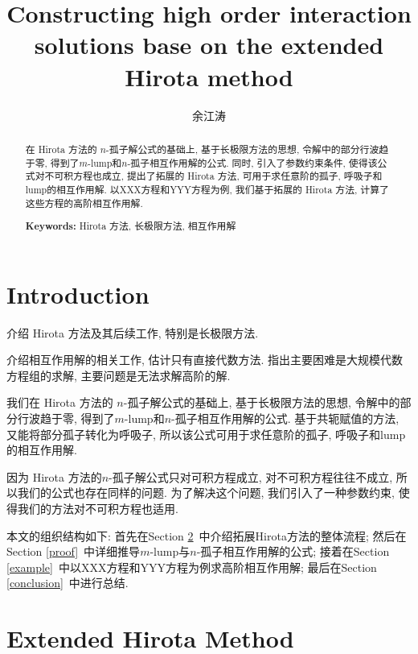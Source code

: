 \documentclass[12pt,a4paper,UTF8]{article}
\newcommand{\refsec}[1]{Section \ref{#1}~}
\begin{document}
\title{Constructing high order interaction solutions base on the extended Hirota method}
\author{余江涛}
\maketitle
\begin{abstract}
在 Hirota 方法的 $n$-孤子解公式的基础上, 基于长极限方法的思想, 令解中的部分行波趋于零, 得到了$m$-lump和$n$-孤子相互作用解的公式. 同时, 引入了参数约束条件, 使得该公式对不可积方程也成立, 提出了拓展的 Hirota 方法, 可用于求任意阶的孤子, 呼吸子和lump的相互作用解. 以XXX方程和YYY方程为例, 我们基于拓展的 Hirota 方法, 计算了这些方程的高阶相互作用解.

\vspace{0.2cm}

{\noindent\bf Keywords:} Hirota 方法, 长极限方法, 相互作用解
\end{abstract}

\section{Introduction}
\begin{compactitem}[\textbullet]
\item 介绍 Hirota 方法及其后续工作, 特别是长极限方法. 
\item 介绍相互作用解的相关工作, 估计只有直接代数方法. 指出主要困难是大规模代数方程组的求解, 主要问题是无法求解高阶的解.
\item 我们在 Hirota 方法的 $n$-孤子解公式的基础上, 基于长极限方法的思想, 令解中的部分行波趋于零, 得到了$m$-lump和$n$-孤子相互作用解的公式. 基于共轭赋值的方法, 又能将部分孤子转化为呼吸子, 所以该公式可用于求任意阶的孤子, 呼吸子和lump的相互作用解.
\item 因为 Hirota 方法的$n$-孤子解公式只对可积方程成立, 对不可积方程往往不成立, 所以我们的公式也存在同样的问题. 为了解决这个问题, 我们引入了一种参数约束, 使得我们的方法对不可积方程也适用. 
\end{compactitem}

本文的组织结构如下: 首先在\refsec{method}中介绍拓展Hirota方法的整体流程; 然后在\refsec{proof}中详细推导$m$-lump与$n$-孤子相互作用解的公式; 接着在\refsec{example}中以XXX方程和YYY方程为例求高阶相互作用解; 最后在\refsec{conclusion}中进行总结. 

\section{Extended Hirota Method}\label{method}
\end{document}
